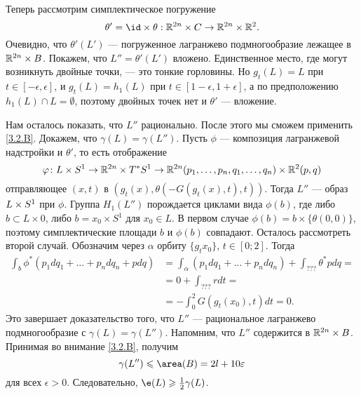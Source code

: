 \begin{figure}[ht!]
\vskip-0mm
\centering
\caption{}\label{pic-3}
\vskip0mm
\end{figure}

Теперь рассмотрим симплектическое погружение 
\[\theta' = \id \times \theta: \RR^{2n} \times C \to \RR^{2n} \times \RR^2.\]
Очевидно, что $\theta' (L')$ --- погруженное лагранжево подмногообразие лежащее в $\mathbb{R}^{2n} \times B$. 
Покажем, что $L'' = \theta' (L')$ вложено.
Единственное место, где могут возникнуть двойные точки, --- это тонкие горловины.
Но $g_t (L) = L$ при $t \in [-\epsilon, \epsilon]$, 
и $g_t (L) = h_1 (L)$ при $t \in [1 - \epsilon, 1 + \epsilon]$, а по предположению $h_1 (L) \cap L = \emptyset$, поэтому двойных точек нет и $\theta'$ --- вложение.

Нам осталось показать, что $L''$ рационально.
После этого мы сможем применить \ref{3.2.B}.
Докажем, что $\gamma (L) = \gamma (L'')$.
Пусть $\phi$ --- композиция лагранжевой надстройки и $\theta'$,
то есть отображение 
\[\varphi\colon 
L \times S^1
\to
\mathbb{R}^{2n} \times T^\ast S^1
\to
\mathbb{R}^{2n} (p_1,\dots, p_n, q_1,\dots, q_n) \times \mathbb{R}^2 (p, q)\]
отправляющее $(x, t)$ в $(g_t (x), \theta (-G (g_t (x), t), t))$.
Тогда $L''$ --- образ $L \z\times S^1$ при $\phi$.
Группа $H_1 (L'')$ порождается циклами вида $\phi (b)$, где либо $b \subset L \times {0}$, либо $b = {x_0} \times S^1$ для $x_0 \in L$.
В первом случае $\phi (b) = b \times \{\theta (0, 0)\}$, поэтому симплектические площади $b$ и $\phi (b)$ совпадают.
Осталось рассмотреть второй случай.
Обозначим через $\alpha$ орбиту $\{g_t x_0\}$, $t \in [0; 2]$.
Тогда
\begin{align*}
\int_b\phi^\ast (p_1 dq_1 +\dots
+ p_n dq_n + pdq)
&= \int_\alpha (p_1 dq_1 +\dots
+ p_n dq_n) + \int_{???}\theta^\ast pdq =
\\
&= 0 + \int_{???} rdt =
\\
&= - \int_0^2G (g_t (x_0), t) dt 
= 0.
\end{align*}
Это завершает доказательство того, что $L''$ --- рациональное лагранжево подмногообразие с $\gamma (L) = \gamma (L'')$.
Напомним, что $L''$ содержится в $\mathbb{R}^{2n} \times B$.
Принимая во внимание \ref{3.2.B}, получим 
\[\gamma (L'') \le \area (B) = 2l + 10\epsilon\]
для всех $\epsilon> 0$.
Следовательно, $\e(L) \ge \tfrac12 \gamma (L)$.
\qeds
